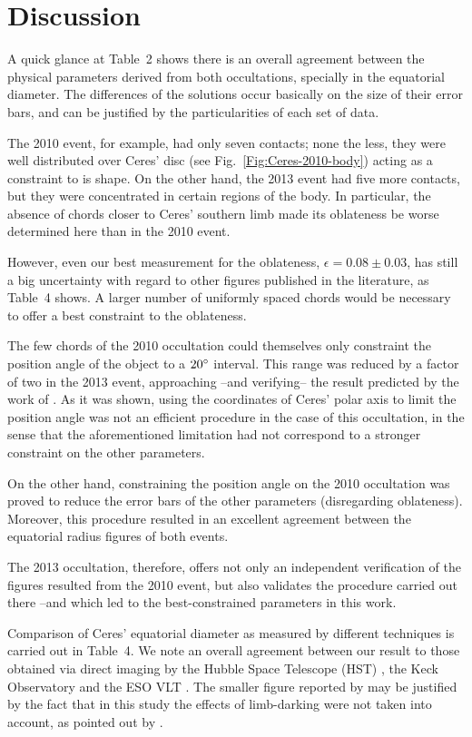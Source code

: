 \documentclass[useAMS,usenatbib]{mn2e}
\begin{document}
\section[]{Discussion}

A quick glance at Table~2 shows there is an overall agreement between the physical parameters derived from both occultations, specially in the equatorial diameter. The differences of the solutions occur basically on the size of their error bars, and can be justified by the particularities of each set of data.

The 2010 event, for example, had only seven contacts; none the less, they were well distributed over Ceres' disc (see Fig.~\ref{Fig:Ceres-2010-body}) acting as a constraint to is shape. On the other hand, the 2013 event had five more contacts, but they were concentrated in certain regions of the body. In particular, the absence of chords closer to Ceres' southern limb made its oblateness be worse determined here than in the 2010 event.

However, even our best measurement for the oblateness, $\epsilon=0.08 \pm 0.03$, has still a big uncertainty with regard to other figures published in the literature, as Table~4 shows. A larger number of uniformly spaced chords would be necessary to offer a best constraint to the oblateness.

The few chords of the 2010 occultation could themselves only constraint the position angle of the object to a $20\hbox{$^\circ$}$ interval. This range was reduced by a factor of two in the 2013 event, approaching --and verifying-- the result predicted by the work of \cite{Drummond2014}. As it was shown, using the coordinates of Ceres' polar axis to limit the position angle was not an efficient procedure in the case of this occultation, in the sense that the aforementioned limitation had not correspond to a stronger constraint on the other parameters.

On the other hand, constraining the position angle on the 2010 occultation was proved to reduce the error bars of the other parameters (disregarding oblateness). Moreover, this procedure resulted in an excellent agreement between the equatorial radius figures of both events.

The 2013 occultation, therefore, offers not only an independent verification of the figures resulted from the 2010 event, but also validates the procedure carried out there --and which led to the best-constrained parameters in this work.

Comparison of Ceres' equatorial diameter as measured by different techniques is carried out in Table~4. We note an overall agreement between our result to those obtained via direct imaging by the Hubble Space Telescope (HST) \citep{Thomas2005}, the Keck Observatory and the ESO VLT \citep{Drummond2014}. The smaller figure reported by \cite{Carry2008} may be justified by the fact that in this study the effects of limb-darking were not taken into account, as pointed out by \cite{Drummond2014}.
\end{document}
